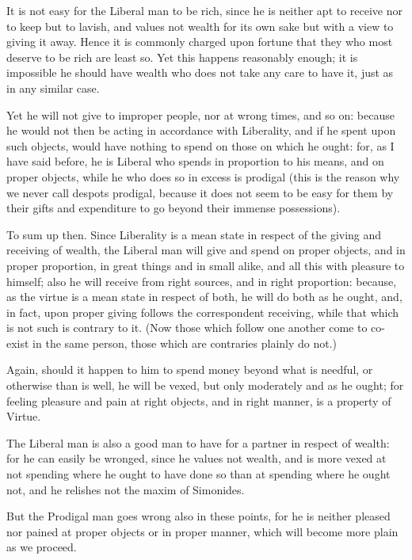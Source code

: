 It is not easy for the Liberal man to be rich, since he is neither apt to
receive nor to keep but to lavish, and values not wealth for its own sake but
with a view to giving it away. Hence it is commonly charged upon fortune that
they who most deserve to be rich are least so. Yet this happens reasonably
enough; it is impossible he should have wealth who does not take any care to
have it, just as in any similar case.

Yet he will not give to improper people, nor at wrong times, and so on: because
he would not then be acting in accordance with Liberality, and if he spent upon
such objects, would have nothing to spend on those on which he ought: for, as I
have said before, he is Liberal who spends in proportion to his means, and on
proper objects, while he who does so in excess is prodigal (this is the reason
why we never call despots prodigal, because it does not seem to be easy for
them by their gifts and expenditure to go beyond their immense possessions).

To sum up then. Since Liberality is a mean state in respect of the giving and
receiving of wealth, the Liberal man will give and spend on proper objects, and
in proper proportion, in great things and in small alike, and all this with
pleasure to himself; also he will receive from right sources, and in right
proportion: because, as the virtue is a mean state in respect of both, he will
do both as he ought, and, in fact, upon proper giving follows the correspondent
receiving, while that which is not such is contrary to it. (Now those which
follow one another come to co-exist in the same person, those which are
contraries plainly do not.)

Again, should it happen to him to spend money beyond what is needful, or
otherwise than is well, he will be vexed, but only moderately and as he ought;
for feeling pleasure and pain at right objects, and in right manner, is a
property of Virtue.

The Liberal man is also a good man to have for a partner in respect of wealth:
for he can easily be wronged, since he values not wealth, and is more vexed at
not spending where he ought to have done so than at spending where he ought
not, and he relishes not the maxim of Simonides.


But the Prodigal man goes wrong also in these points, for he is neither pleased
nor pained at proper objects or in proper manner, which will become more plain
as we proceed.

